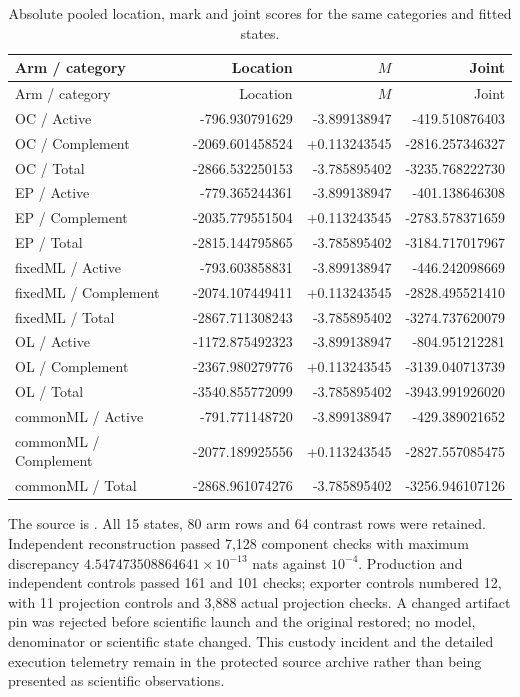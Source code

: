 \begin{longtable}{@{}p{}rrr@{}}
\caption{Absolute pooled location, mark and joint scores for the same categories and fitted states.}\\
\toprule Arm / category & Location & $M$ & Joint \\\midrule\endfirsthead
\toprule Arm / category & Location & $M$ & Joint \\\midrule\endhead
OC / Active & -796.930791629 & -3.899138947 & -419.510876403 \\
OC / Complement & -2069.601458524 & +0.113243545 & -2816.257346327 \\
OC / Total & -2866.532250153 & -3.785895402 & -3235.768222730 \\
EP / Active & -779.365244361 & -3.899138947 & -401.138646308 \\
EP / Complement & -2035.779551504 & +0.113243545 & -2783.578371659 \\
EP / Total & -2815.144795865 & -3.785895402 & -3184.717017967 \\
fixedML / Active & -793.603858831 & -3.899138947 & -446.242098669 \\
fixedML / Complement & -2074.107449411 & +0.113243545 & -2828.495521410 \\
fixedML / Total & -2867.711308243 & -3.785895402 & -3274.737620079 \\
OL / Active & -1172.875492323 & -3.899138947 & -804.951212281 \\
OL / Complement & -2367.980279776 & +0.113243545 & -3139.040713739 \\
OL / Total & -3540.855772099 & -3.785895402 & -3943.991926020 \\
commonML / Active & -791.771148720 & -3.899138947 & -429.389021652 \\
commonML / Complement & -2077.189925556 & +0.113243545 & -2827.557085475 \\
commonML / Total & -2868.961074276 & -3.785895402 & -3256.946107126 \\
\bottomrule\end{longtable}\endgroup

The source is . All 15 states, 80 arm rows and 64 contrast rows were retained. Independent reconstruction passed 7,128 component checks with maximum discrepancy $4.547473508864641\times10^{-13}$ nats against $10^{-4}$. Production and independent controls passed 161 and 101 checks; exporter controls numbered 12, with 11 projection controls and 3,888 actual projection checks. A changed artifact pin was rejected before scientific launch and the original restored; no model, denominator or scientific state changed. This custody incident and the detailed execution telemetry remain in the protected source archive rather than being presented as scientific observations.

